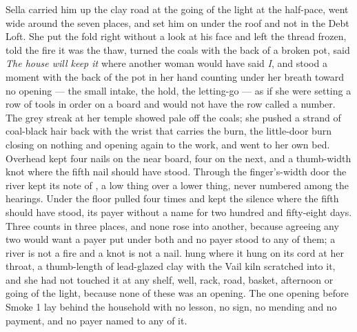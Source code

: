 Sella carried him up the clay road at the going of the light at the half-pace, went wide around the seven places, and set him on  under the roof and not in the Debt Loft. She put the fold right without a look at his face and left the thread frozen, told the fire it was the thaw, turned the coals with the back of a broken pot, said \emph{The house will keep it} where another woman would have said \emph{I}, and stood a moment with the back of the pot in her hand counting under her breath toward no opening --- the small intake, the hold, the letting-go --- as if she were setting a row of tools in order on a board and would not have the row called a number. The grey streak at her temple showed pale off the coals; she pushed a strand of coal-black hair back with the wrist that carries the burn, the little-door burn closing on nothing and opening again to the work, and went to her own bed. Overhead  kept four nails on the near board, four on the next, and a thumb-width knot where the fifth nail should have stood. Through the finger's-width door the river kept its note of , a low thing over a lower thing, never numbered among the hearings. Under the floor  pulled four times and kept the silence where the fifth should have stood, its payer without a name for two hundred and fifty-eight days. Three counts in three places, and none rose into another, because agreeing any two would want a payer put under both and no payer stood to any of them; a river is not a fire and a knot is not a nail.  hung where it hung on its cord at her throat, a thumb-length of lead-glazed clay with the Vail kiln scratched into it, and she had not touched it at any shelf, well, rack, road, basket, afternoon or going of the light, because none of these was an opening. The one opening before Smoke 1 lay behind the household with no lesson, no sign, no mending and no payment, and no payer named to any of it.

\scenebreak

